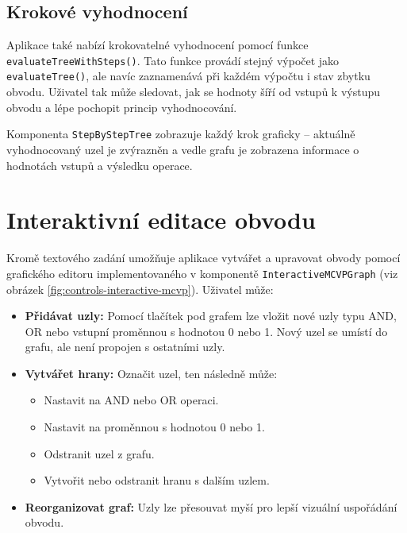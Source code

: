 \subsection{Krokové vyhodnocení}
\label{sec:MCVPStepByStep}

Aplikace také nabízí krokovatelné vyhodnocení pomocí funkce \texttt{evaluateTreeWithSteps()}. Tato funkce provádí stejný výpočet jako \texttt{evaluateTree()}, ale navíc zaznamenává při každém výpočtu i stav zbytku obvodu. Uživatel tak může sledovat, jak se hodnoty šíří od vstupů k výstupu obvodu a lépe pochopit princip vyhodnocování.

Komponenta \texttt{StepByStepTree} zobrazuje každý krok graficky – aktuálně vyhodnocovaný uzel je zvýrazněn a vedle grafu je zobrazena informace o hodnotách vstupů a výsledku operace.

\section{Interaktivní editace obvodu}
\label{sec:MCVPInteractive}

Kromě textového zadání umožňuje aplikace vytvářet a upravovat obvody pomocí grafického editoru implementovaného v komponentě \texttt{InteractiveMCVPGraph} (viz obrázek \ref{fig:controls-interactive-mcvp}). Uživatel může:

\begin{itemize}
    \item \textbf{Přidávat uzly:} Pomocí tlačítek pod grafem lze vložit nové uzly typu AND, OR nebo vstupní proměnnou s hodnotou 0 nebo 1. Nový uzel se umístí do grafu, ale není propojen s ostatními uzly.
    
    \item \textbf{Vytvářet hrany:} Označit uzel, ten následně může:
    \begin{itemize}
        \item Nastavit na AND nebo OR operaci.
        \item Nastavit na proměnnou s hodnotou 0 nebo 1.
        \item Odstranit uzel z grafu.
        \item Vytvořit nebo odstranit hranu s dalším uzlem.
    \end{itemize}
        
    \item \textbf{Reorganizovat graf:} Uzly lze přesouvat myší pro lepší vizuální uspořádání obvodu.
\end{itemize}


